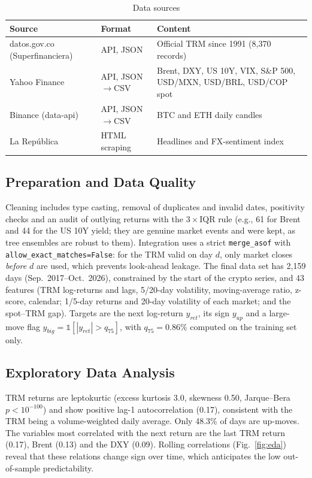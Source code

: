 \documentclass[conference]{IEEEtran}
\begin{document}
\begin{table}[t]
\caption{Data sources}
\label{tab:sources}
\centering
\footnotesize
\begin{tabular}{@{}p{2.1cm}p{1.4cm}p{3.9cm}@{}}
\toprule
Source & Format & Content \\
\midrule
datos.gov.co (Superfinanciera) & API, JSON & Official TRM since 1991 (8{,}370 records) \\
Yahoo Finance & API, JSON$\to$CSV & Brent, DXY, US 10Y, VIX, S\&P 500, USD/MXN, USD/BRL, USD/COP spot \\
Binance (data-api) & API, JSON$\to$CSV & BTC and ETH daily candles \\
La Rep\'ublica & HTML scraping & Headlines and FX-sentiment index \\
\bottomrule
\end{tabular}
\end{table}

\subsection{Preparation and Data Quality}
Cleaning includes type casting, removal of duplicates and invalid dates, positivity checks and an audit of outlying returns with the $3\times$IQR rule (e.g., 61 for Brent and 44 for the US 10Y yield; they are genuine market events and were kept, as tree ensembles are robust to them). Integration uses a strict \texttt{merge\_asof} with \texttt{allow\_exact\_matches=False}: for the TRM valid on day $d$, only market closes \emph{before} $d$ are used, which prevents look-ahead leakage. The final data set has 2{,}159 days (Sep.~2017--Oct.~2026), constrained by the start of the crypto series, and 43 features (TRM log-returns and lags, 5/20-day volatility, moving-average ratio, z-score, calendar; 1/5-day returns and 20-day volatility of each market; and the spot--TRM gap). Targets are the next log-return $y_{ret}$, its sign $y_{up}$ and a large-move flag $y_{big}=\mathbb{1}[|y_{ret}|>q_{75}]$, with $q_{75}=0.86\%$ computed on the training set only.

\subsection{Exploratory Data Analysis}
TRM returns are leptokurtic (excess kurtosis 3.0, skewness 0.50, Jarque--Bera $p<10^{-100}$) and show positive lag-1 autocorrelation (0.17), consistent with the TRM being a volume-weighted daily average. Only 48.3\% of days are up-moves. The variables most correlated with the next return are the last TRM return (0.17), Brent (0.13) and the DXY (0.09). Rolling correlations (Fig.~\ref{fig:eda}) reveal that these relations change sign over time, which anticipates the low out-of-sample predictability.
\end{document}
